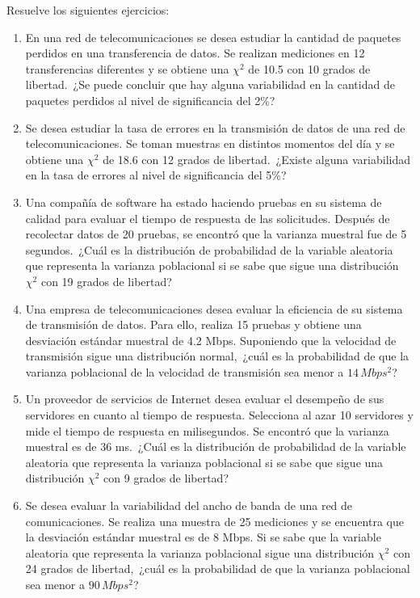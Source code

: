 \begin{Ejer}
Resuelve los siguientes ejercicios:
\begin{enumerate}

\item En una red de telecomunicaciones se desea estudiar la cantidad de paquetes perdidos en una transferencia de datos. Se realizan mediciones en 12 transferencias diferentes y se obtiene una $\chi^2$ de 10.5 con 10 grados de libertad. \,¿Se puede concluir que hay alguna variabilidad en la cantidad de paquetes perdidos al nivel de significancia del 2\%?

\item Se desea estudiar la tasa de errores en la transmisi\'on de datos de una red de telecomunicaciones. Se toman muestras en distintos momentos del d\'ia y se obtiene una $\chi^2$ de 18.6 con 12 grados de libertad. \,¿Existe alguna variabilidad en la tasa de errores al nivel de significancia del 5\%?

\item Una compa\~n\'ia de software ha estado haciendo pruebas en su sistema de calidad para evaluar el tiempo de respuesta de las solicitudes. Despu\'es de recolectar datos de 20 pruebas, se encontr\'o que la varianza muestral fue de 5 segundos. \,¿Cu\'al es la distribuci\'on de probabilidad de la variable aleatoria que representa la varianza poblacional si se sabe que sigue una distribuci\'on $\chi^2$ con 19 grados de libertad?

\item Una empresa de telecomunicaciones desea evaluar la eficiencia de su sistema de transmisi\'on de datos. Para ello, realiza 15 pruebas y obtiene una desviaci\'on est\'andar muestral de 4.2 Mbps. Suponiendo que la velocidad de transmisi\'on sigue una distribuci\'on normal, \,¿cu\'al es la probabilidad de que la varianza poblacional de la velocidad de transmisi\'on sea menor a $14\, Mbps^2$?

\item Un proveedor de servicios de Internet desea evaluar el desempe\~no de sus servidores en cuanto al tiempo de respuesta. Selecciona al azar 10 servidores y mide el tiempo de respuesta en milisegundos. Se encontr\'o que la varianza muestral es de 36 ms. \,¿Cu\'al es la distribuci\'on de probabilidad de la variable aleatoria que representa la varianza poblacional si se sabe que sigue una distribuci\'on $\chi^2$ con 9 grados de libertad?

\item Se desea evaluar la variabilidad del ancho de banda de una red de comunicaciones. Se realiza una muestra de 25 mediciones y se encuentra que la desviaci\'on est\'andar muestral es de 8 Mbps. Si se sabe que la variable aleatoria que representa la varianza poblacional sigue una distribuci\'on $\chi^2$ con 24 grados de libertad, \,¿cu\'al es la probabilidad de que la varianza poblacional sea menor a $90\, Mbps^2$?


\end{enumerate}
\end{Ejer}
